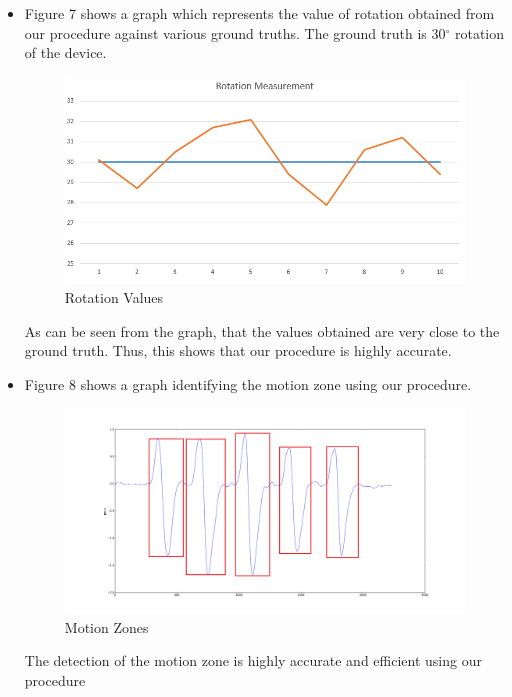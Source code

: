 \documentclass{article}
\begin{document}
\begin{itemize}
			\item Figure 7 shows a graph which represents the value of rotation obtained from our procedure against various ground truths. The ground truth is 30$^{\circ}$ rotation of the device.
				   \begin{figure}[H]
    			      \centering
    			      \includegraphics[width=0.55\linewidth]{rot.png}
    			      \caption{Rotation Values}
    			\end{figure}
    		As can be seen from the graph, that the values obtained are very close to the ground truth. Thus, this shows that our procedure is highly accurate.
    		

			\item Figure 8 shows a graph identifying the motion zone using our procedure.
			   \begin{figure}[H]
    			      \centering
    			      \includegraphics[width=1.0\linewidth]{motion.png}
    			      \caption{Motion Zones}
    			\end{figure}
    		The detection of the motion zone is highly accurate and efficient using our procedure

			\end{itemize} 
\end{document}
